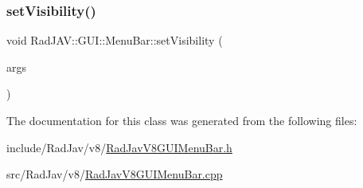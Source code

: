 \mbox{\label{class_rad_j_a_v_1_1_g_u_i_1_1_menu_bar_a7cecf943e9f20cf328dc7c3505c3280a}} 
\subsubsection{\texorpdfstring{set\+Visibility()}{setVisibility()}}
{\footnotesize\ttfamily void Rad\+J\+A\+V\+::\+G\+U\+I\+::\+Menu\+Bar\+::set\+Visibility (\begin{DoxyParamCaption}\item[{const v8\+::\+Function\+Callback\+Info$<$ v8\+::\+Value $>$ \&}]{args }\end{DoxyParamCaption})\hspace{0.3cm}{\ttfamily [static]}}



The documentation for this class was generated from the following files\+:\begin{DoxyCompactItemize}
\item 
include/\+Rad\+Jav/v8/\mbox{\hyperlink{_rad_jav_v8_g_u_i_menu_bar_8h}{Rad\+Jav\+V8\+G\+U\+I\+Menu\+Bar.\+h}}\item 
src/\+Rad\+Jav/v8/\mbox{\hyperlink{_rad_jav_v8_g_u_i_menu_bar_8cpp}{Rad\+Jav\+V8\+G\+U\+I\+Menu\+Bar.\+cpp}}\end{DoxyCompactItemize}
